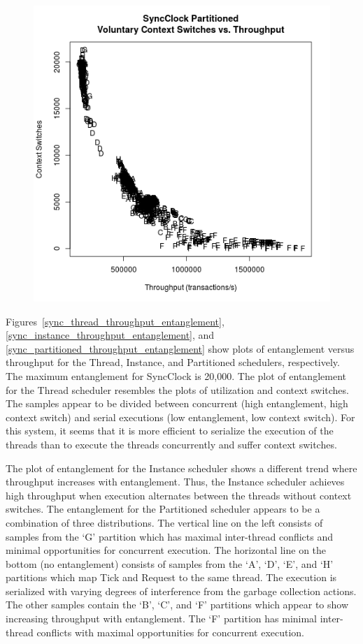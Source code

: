 \begin{figure}
\center
\includegraphics[height=.4\textheight]{sync_partitioned_throughput_context.png}
\caption{\label{sync_partitioned_throughput_context}}
\end{figure}

Figures~\ref{sync_thread_throughput_entanglement}, \ref{sync_instance_throughput_entanglement}, and \ref{sync_partitioned_throughput_entanglement} show plots of entanglement versus throughput for the Thread, Instance, and Partitioned schedulers, respectively.
The maximum entanglement for SyncClock is 20,000.
The plot of entanglement for the Thread scheduler resembles the plots of utilization and context switches.
The samples appear to be divided between concurrent (high entanglement, high context switch) and serial executions (low entanglement, low context switch).
For this system, it seems that it is more efficient to serialize the execution of the threads than to execute the threads concurrently and suffer context switches.

The plot of entanglement for the Instance scheduler shows a different trend where throughput increases with entanglement.
Thus, the Instance scheduler achieves high throughput when execution alternates between the threads without context switches.
The entanglement for the Partitioned scheduler appears to be a combination of three distributions.
The vertical line on the left consists of samples from the `G' partition which has maximal inter-thread conflicts and minimal opportunities for concurrent execution.
The horizontal line on the bottom (no entanglement) consists of samples from the `A', `D', `E', and `H' partitions which map Tick and Request to the same thread.
The execution is serialized with varying degrees of interference from the garbage collection actions.
The other samples contain the `B', `C', and `F' partitions which appear to show increasing throughput with entanglement.
The `F' partition has minimal inter-thread conflicts with maximal opportunities for concurrent execution.

